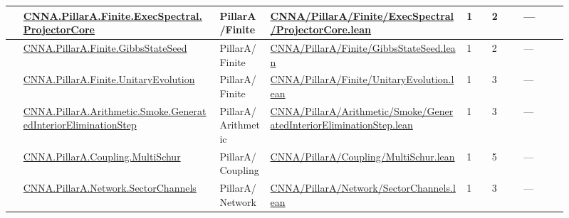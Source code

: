 \begin{longtable}{L{0.025\linewidth} L{0.315\linewidth} L{0.08\linewidth} L{0.315\linewidth} L{0.045\linewidth} L{0.055\linewidth} L{0.07\linewidth}}
\hline
{} & \href{run:repo_snapshot/CNNA/PillarA/Finite/ExecSpectral/ProjectorCore.lean}{CNNA.\allowbreak{}PillarA.\allowbreak{}Finite.\allowbreak{}ExecSpectral.\allowbreak{}ProjectorCore} & PillarA/\allowbreak{}Finite & \href{run:repo_snapshot/CNNA/PillarA/Finite/ExecSpectral/ProjectorCore.lean}{CNNA/\allowbreak{}PillarA/\allowbreak{}Finite/\allowbreak{}ExecSpectral/\allowbreak{}ProjectorCore.\allowbreak{}lean} & 1 & 2 & ---\\
\hline
{} & \href{run:repo_snapshot/CNNA/PillarA/Finite/GibbsStateSeed.lean}{CNNA.\allowbreak{}PillarA.\allowbreak{}Finite.\allowbreak{}GibbsStateSeed} & PillarA/\allowbreak{}Finite & \href{run:repo_snapshot/CNNA/PillarA/Finite/GibbsStateSeed.lean}{CNNA/\allowbreak{}PillarA/\allowbreak{}Finite/\allowbreak{}GibbsStateSeed.\allowbreak{}lean} & 1 & 2 & ---\\
\hline
{} & \href{run:repo_snapshot/CNNA/PillarA/Finite/UnitaryEvolution.lean}{CNNA.\allowbreak{}PillarA.\allowbreak{}Finite.\allowbreak{}UnitaryEvolution} & PillarA/\allowbreak{}Finite & \href{run:repo_snapshot/CNNA/PillarA/Finite/UnitaryEvolution.lean}{CNNA/\allowbreak{}PillarA/\allowbreak{}Finite/\allowbreak{}UnitaryEvolution.\allowbreak{}lean} & 1 & 3 & ---\\
\hline
{} & \href{run:repo_snapshot/CNNA/PillarA/Arithmetic/Smoke/GeneratedInteriorEliminationStep.lean}{CNNA.\allowbreak{}PillarA.\allowbreak{}Arithmetic.\allowbreak{}Smoke.\allowbreak{}GeneratedInteriorEliminationStep} & PillarA/\allowbreak{}Arithmetic & \href{run:repo_snapshot/CNNA/PillarA/Arithmetic/Smoke/GeneratedInteriorEliminationStep.lean}{CNNA/\allowbreak{}PillarA/\allowbreak{}Arithmetic/\allowbreak{}Smoke/\allowbreak{}GeneratedInteriorEliminationStep.\allowbreak{}lean} & 1 & 3 & ---\\
\hline
{} & \href{run:repo_snapshot/CNNA/PillarA/Coupling/MultiSchur.lean}{CNNA.\allowbreak{}PillarA.\allowbreak{}Coupling.\allowbreak{}MultiSchur} & PillarA/\allowbreak{}Coupling & \href{run:repo_snapshot/CNNA/PillarA/Coupling/MultiSchur.lean}{CNNA/\allowbreak{}PillarA/\allowbreak{}Coupling/\allowbreak{}MultiSchur.\allowbreak{}lean} & 1 & 5 & ---\\
\hline
{} & \href{run:repo_snapshot/CNNA/PillarA/Network/SectorChannels.lean}{CNNA.\allowbreak{}PillarA.\allowbreak{}Network.\allowbreak{}SectorChannels} & PillarA/\allowbreak{}Network & \href{run:repo_snapshot/CNNA/PillarA/Network/SectorChannels.lean}{CNNA/\allowbreak{}PillarA/\allowbreak{}Network/\allowbreak{}SectorChannels.\allowbreak{}lean} & 1 & 3 & ---\\

\end{longtable}
